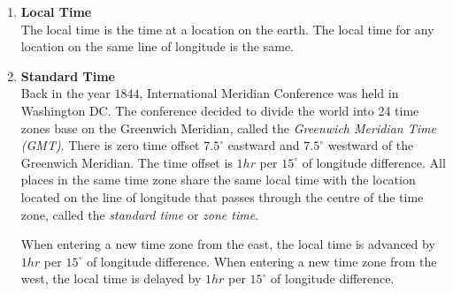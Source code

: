 \documentclass{report}
\begin{document}
\begin{multicols}{2}
    \begin{enumerate}[listparindent=1.5em]
        \item \textbf{Local Time}\\
              The local time is the time at a location on the earth. The local time for any location on the same line of longitude is the same.
        \item \textbf{Standard Time}\\
              Back in the year $1844$, International Meridian Conference was held in Washington DC. The conference decided to divide the world into 24 time zones base on the Greenwich Meridian, called the \emph{Greenwich Meridian Time (GMT)}. There is zero time offset $7.5^\circ$ eastward and $7.5^\circ$ westward of the Greenwich Meridian. The time offset is $1hr$ per $15^\circ$ of longitude difference. All places in the same time zone share the same local time with the location located on the line of longitude that passes through the centre of the time zone, called the \emph{standard time} or \emph{zone time}.

              \indent When entering a new time zone from the east, the local time is advanced by
              $1hr$ per $15^\circ$ of longitude difference. When entering a new time zone
              from the west, the local time is delayed by $1hr$ per $15^\circ$ of longitude
              difference.
    \end{enumerate}
\end{multicols}
\begin{center}
\end{center}
\end{document}
